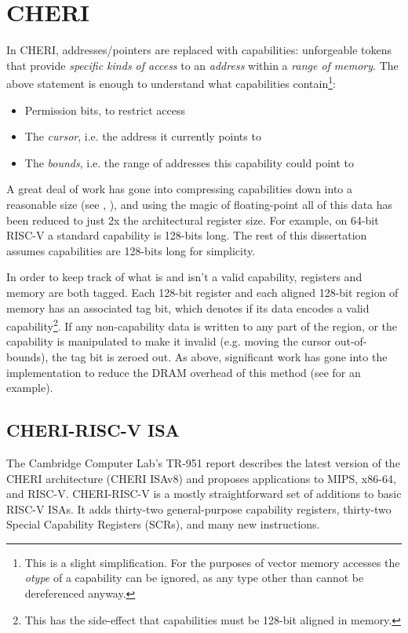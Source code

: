 \section{CHERI}\label{chap:bg:sec:cheri}
In CHERI, addresses/pointers are replaced with capabilities: unforgeable tokens that provide \emph{specific kinds of access} to an \emph{address} within a \emph{range of memory}.
The above statement is enough to understand what capabilities contain\footnote{This is a slight simplification. For the purposes of vector memory accesses the \emph{otype} of a capability can be ignored, as any type other than  cannot be dereferenced anyway.}:
\begin{itemize}
    \item Permission bits, to restrict access
    \item The \emph{cursor}, i.e. the address it currently points to
    \item The \emph{bounds}, i.e. the range of addresses this capability could point to
\end{itemize}
A great deal of work has gone into compressing capabilities down into a reasonable size (see \cite{woodruffCHERIConcentratePractical2019}, ), and using the magic of floating-point all of this data has been reduced to just 2x the architectural register size.
For example, on 64-bit RISC-V a standard capability is 128-bits long.
The rest of this dissertation assumes capabilities are 128-bits long for simplicity.

In order to keep track of what is and isn't a valid capability, registers and memory are both tagged.
Each 128-bit register and each aligned 128-bit region of memory has an associated tag bit, which denotes if its data encodes a valid capability\footnote{This has the side-effect that capabilities must be 128-bit aligned in memory.}.
If any non-capability data is written to any part of the region, or the capability is manipulated to make it invalid (e.g. moving the cursor out-of-bounds), the tag bit is zeroed out.
As above, significant work has gone into the implementation to reduce the DRAM overhead of this method (see \cite{joannouEfficientTaggedMemory2017} for an example).



\subsection{CHERI-RISC-V ISA}
The Cambridge Computer Lab's TR-951 report describes the latest version of the CHERI architecture (CHERI ISAv8) and proposes applications to MIPS, x86-64, and RISC-V.
CHERI-RISC-V is a mostly straightforward set of additions to basic RISC-V ISAs.
It adds thirty-two general-purpose capability registers, thirty-two Special Capability Registers (SCRs), and many new instructions.

